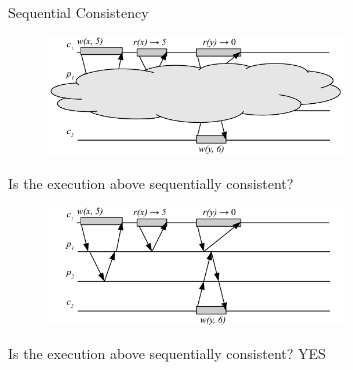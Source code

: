 \begin{frame}{Sequential Consistency}

\begin{overprint}

\begin{figure}
\includegraphics[width=0.7\textwidth]{figs/09/seq-04}
\end{figure}

\begin{example}

\BIL
\item Is the execution above sequentially consistent? 
\EIL

\end{example}

\begin{figure}
\includegraphics[width=0.7\textwidth]{figs/09/seq-04n}
\end{figure}

\begin{example}

\BIL
\item Is the execution above sequentially consistent? YES
\EIL

\end{example}

\end{overprint}

\end{frame}


